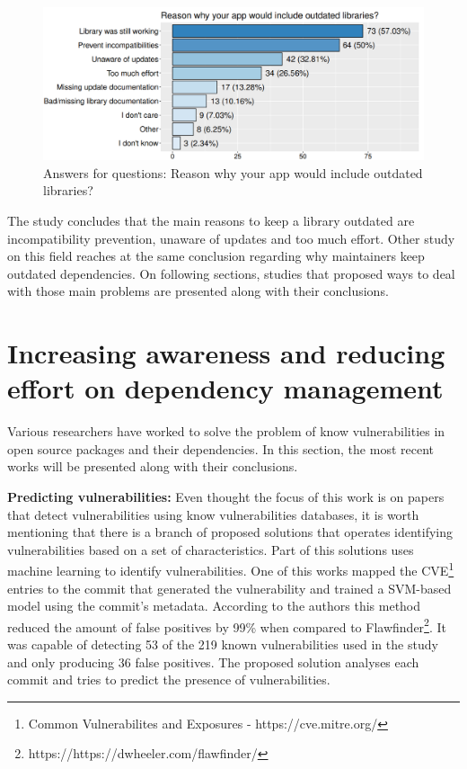 \documentclass[pdf,bookmarks,colorlinks=true]{IEEEtran}
\begin{document}
\begin{figure}[h]
	\centering
	\includegraphics[scale=0.28]{ReasonsOutdatedLibrary.png}
	\caption{Answers for questions: Reason why your app would include outdated libraries?}
	\label{ReasonsOutdatedLibrary}
\end{figure}

The study concludes that the main reasons to keep a library outdated are incompatibility prevention, unaware of updates and too much effort. Other study on this field \cite{Kula2018} reaches at the same conclusion regarding why maintainers keep outdated dependencies. On following sections, studies that proposed ways to deal with those main problems are presented along with their conclusions.

\section{Increasing awareness and reducing effort on dependency management}
\label{sec:IncreasingAwarenessReducingEffort}

Various researchers have worked to solve the problem of know vulnerabilities in open source packages and their dependencies. In this section, the most recent works will be presented along with their conclusions.

\textbf{Predicting vulnerabilities:}
Even thought the focus of this work is on papers that detect vulnerabilities using know vulnerabilities databases, it is worth mentioning that there is a branch of proposed solutions that operates identifying vulnerabilities based on a set of characteristics. Part of this solutions uses machine learning to identify vulnerabilities. One of this works \cite{Perl2015} mapped the CVE\footnote{Common Vulnerabilites and Exposures - https://cve.mitre.org/} entries to the commit that generated the vulnerability and trained a SVM-based model using the commit's metadata. According to the authors this method reduced the amount of false positives by 99\% when compared to Flawfinder\footnote{https://https://dwheeler.com/flawfinder/}. It was capable of detecting 53 of the 219 known vulnerabilities used in the study and only producing 36 false positives. The proposed solution analyses each commit and tries to predict the presence of vulnerabilities.
\end{document}
